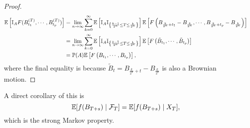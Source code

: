 \begin{proof}
\begin{align*}
        \mathbb{E}\left[\mathbb{I}_A F(B^{(T)}_{t_1},\cdots,B^{(T)}_{t_p})\right] &= \lim_{n\rightarrow \infty} \sum_{k=0}^\infty \mathbb{E}\left[\mathbb{I}_A\mathbb{I}_{\left\{ \frac{k-1}{2^n}\leq T \leq \frac{k}{2^n} \right\}}\right]\mathbb{E}\left[F\left(B_{\frac{k}{2^n}+t_1} - B_{\frac{k}{2^n}},\cdots,B_{\frac{k}{2^n}+t_p}-B_{\frac{k}{2^n}} \right)\right] \\
        &= \lim_{n\rightarrow \infty} \sum_{k=0}^\infty \mathbb{E}\left[\mathbb{I}_A\mathbb{I}_{\left\{ \frac{k-1}{2^n}\leq T \leq \frac{k}{2^n} \right\}}\right]\mathbb{E}\left[F\left(\tilde{B}_{t_1},\cdots, \tilde{B}_{t_p}\right)\right]\\
        &= \mathbb{P}(A) \mathbb{E}\left[F\left(B_{t_1},\cdots, B_{t_p}\right)\right],
    \end{align*}
    where the final equality is because $ \tilde{B}_t= B_{\frac{k}{2^n}+t}-B_{\frac{k}{2^n}}$ is also a Brownian motion.
\end{proof}
\begin{rmk}
    A direct corollary of this is
    \begin{equation*}
        \mathbb{E}[f(B_{T+s}) \mid \mathcal{F}_T] = \mathbb{E}[f(B_{T+s}) \mid X_T],
    \end{equation*}
    which is the strong Markov property.
\end{rmk}

